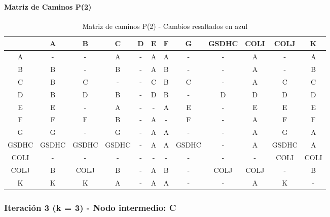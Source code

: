 \documentclass[12pt]{article}
\begin{document}
\paragraph{Matriz de Caminos P(2)}
\begin{table}[h!]
\centering
\begin{tabular}{|c|c|c|c|c|c|c|c|c|c|c|c|}
\hline
 & A & B & C & D & E & F & G & GSDHC & COLI & COLJ & K \\\hline
A & - & - & A & - & A & A & - & - & A & - & A \\\hline
B & B & - & B & - & A & B & - & - & A & - & B \\\hline
C & \cellcolor{lightblue} B & C & - & - & C & \cellcolor{lightblue} B & C & - & \cellcolor{lightblue} A & C & C \\\hline
D & \cellcolor{lightblue} B & D & \cellcolor{lightblue} B & - & D & \cellcolor{lightblue} B & - & D & D & D & D \\\hline
E & E & - & A & - & - & A & E & - & E & E & E \\\hline
F & F & F & \cellcolor{lightblue} B & - & A & - & F & - & A & F & F \\\hline
G & G & - & G & - & A & A & - & - & A & G & A \\\hline
GSDHC & GSDHC & GSDHC & GSDHC & - & A & A & GSDHC & - & A & GSDHC & A \\\hline
COLI & - & - & - & - & - & - & - & - & - & COLI & COLI \\\hline
COLJ & \cellcolor{lightblue} B & COLJ & \cellcolor{lightblue} B & - & A & \cellcolor{lightblue} B & - & COLJ & COLJ & - & \cellcolor{lightblue} B \\\hline
K & K & K & A & - & A & A & - & - & A & K & - \\\hline
\end{tabular}
\caption{Matriz de caminos P(2) - Cambios resaltados en azul}
\end{table}

\subsubsection{Iteración 3 (k = 3) - Nodo intermedio: C}
\end{document}
